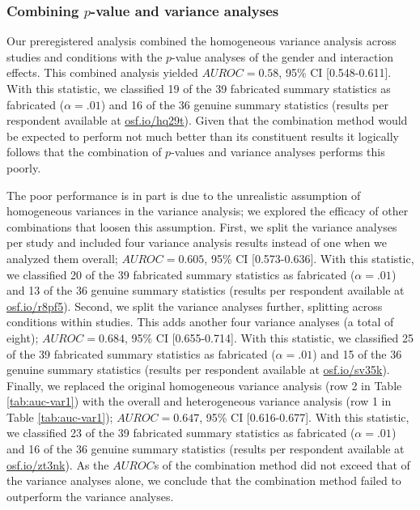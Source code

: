 \documentclass[a5paper]{book}
\begin{document}
\subsubsection{\texorpdfstring{Combining \(p\)-value and variance
analyses}{Combining p-value and variance analyses}}\label{combining-p-value-and-variance-analyses}

Our preregistered analysis combined the homogeneous variance analysis
across studies and conditions with the \(p\)-value analyses of the
gender and interaction effects. This combined analysis yielded
\(AUROC=0.58\), 95\% CI {[}0.548-0.611{]}. With this statistic, we
classified 19 of the 39 fabricated summary statistics as fabricated
(\(\alpha=.01\)) and 16 of the 36 genuine summary statistics (results
per respondent available at \href{https://osf.io/hq29t}{osf.io/hq29t}).
Given that the combination method would be expected to perform not much
better than its constituent results it logically follows that the
combination of \(p\)-values and variance analyses performs this poorly.

The poor performance is in part is due to the unrealistic assumption of
homogeneous variances in the variance analysis; we explored the efficacy
of other combinations that loosen this assumption. First, we split the
variance analyses per study and included four variance analysis results
instead of one when we analyzed them overall; \(AUROC=0.605\), 95\% CI
{[}0.573-0.636{]}. With this statistic, we classified 20 of the 39
fabricated summary statistics as fabricated (\(\alpha=.01\)) and 13 of
the 36 genuine summary statistics (results per respondent available at
\href{https://osf.io/r8pf5}{osf.io/r8pf5}). Second, we split the
variance analyses further, splitting across conditions within studies.
This adds another four variance analyses (a total of eight);
\(AUROC=0.684\), 95\% CI {[}0.655-0.714{]}. With this statistic, we
classified 25 of the 39 fabricated summary statistics as fabricated
(\(\alpha=.01\)) and 15 of the 36 genuine summary statistics (results
per respondent available at \href{https://osf.io/sv35k}{osf.io/sv35k}).
Finally, we replaced the original homogeneous variance analysis (row 2
in Table \ref{tab:auc-var1}) with the overall and heterogeneous variance
analysis (row 1 in Table \ref{tab:auc-var1}); \(AUROC=0.647\), 95\% CI
{[}0.616-0.677{]}. With this statistic, we classified 23 of the 39
fabricated summary statistics as fabricated (\(\alpha=.01\)) and 16 of
the 36 genuine summary statistics (results per respondent available at
\href{https://osf.io/zt3nk}{osf.io/zt3nk}). As the \(AUROC\)s of the
combination method did not exceed that of the variance analyses alone,
we conclude that the combination method failed to outperform the
variance analyses.
\end{document}
